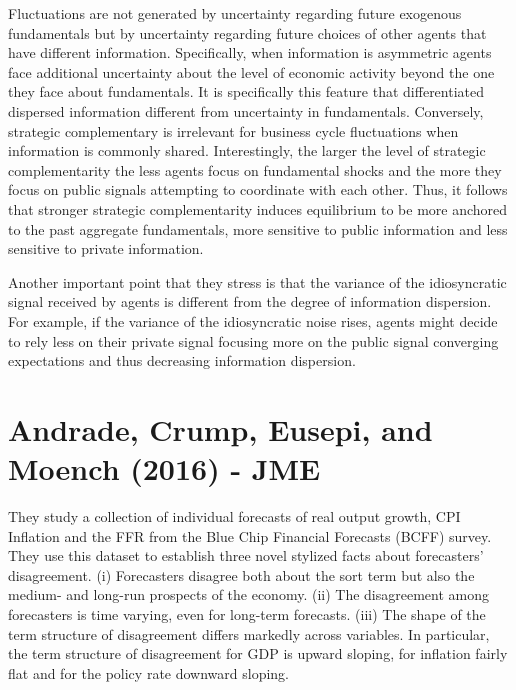 \documentclass{article}
\begin{document}
{Fluctuations are not generated by uncertainty regarding future exogenous fundamentals but by uncertainty regarding future choices of other agents that have different information. Specifically, when information is asymmetric agents face additional uncertainty about the level of economic activity beyond the one they face about fundamentals. It is specifically this feature that differentiated dispersed information different from uncertainty in fundamentals. Conversely, strategic complementary is irrelevant for business cycle fluctuations when information is commonly shared. Interestingly, the larger the level of strategic complementarity the less agents focus on fundamental shocks and the more they focus on public signals attempting to coordinate with each other. Thus, it follows that stronger strategic complementarity induces equilibrium to be more anchored to the past aggregate fundamentals, more sensitive to public information and less sensitive to private information.

Another important point that they stress is that the variance of the idiosyncratic signal received by agents is different from the degree of information dispersion. For example, if the variance of the idiosyncratic noise rises, agents might decide to rely less on their private signal focusing more on the public signal converging expectations and thus decreasing information dispersion. 


\section{Andrade, Crump, Eusepi, and Moench (2016) - JME}

They study a collection of individual forecasts of real output growth, CPI Inflation and the FFR from the Blue Chip Financial Forecasts (BCFF) survey. They use this dataset to establish three novel stylized facts about forecasters' disagreement. (i) Forecasters disagree both about the sort term but also the medium- and long-run prospects of the economy. (ii) The disagreement among forecasters is time varying, even for long-term forecasts. (iii) The shape of the term structure of disagreement differs markedly across variables. In particular, the term structure of disagreement for GDP is upward sloping, for inflation fairly flat and for the policy rate downward sloping. 

}
\end{document}
